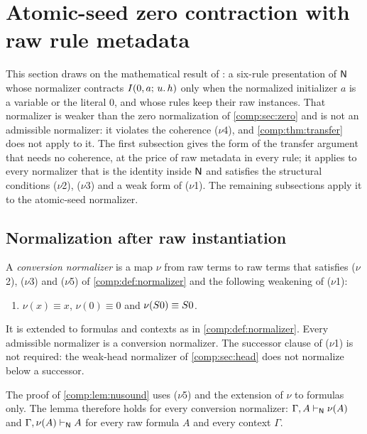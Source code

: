 \section{Atomic-seed zero contraction with raw rule metadata}
\label{comp:sec:atomic}

This section draws on the mathematical result of
: a six-rule presentation of $\mathsf{N}$ whose
normalizer contracts $I(0,a;\,u.\,h)$ only when the normalized initializer
$a$ is a variable or the literal $0$, and whose rules keep their raw
instances. That normalizer is weaker than the zero normalization of
\cref{comp:sec:zero} and is not an admissible normalizer: it violates the
coherence ($\nu$4), and \cref{comp:thm:transfer} does not apply to it. The
first subsection gives the form of the transfer argument that needs no
coherence, at the price of raw metadata in every rule; it applies to every
normalizer that is the identity inside $\mathsf{N}$ and satisfies the structural
conditions ($\nu$2), ($\nu$3) and a weak form of ($\nu$1). The remaining
subsections
apply it to the atomic-seed normalizer.

\subsection{Normalization after raw instantiation}

\begin{definition}
\label{comp:def:convnorm}
A \emph{conversion normalizer} is a map $\nu$ from raw terms to raw terms
that satisfies ($\nu$2), ($\nu$3) and ($\nu$5) of
\cref{comp:def:normalizer} and the following weakening of ($\nu$1):
\begin{enumerate}[label=($\nu$1$^{-}$)]
\item $\nu(x)\equiv x$, $\nu(0)\equiv0$ and $\nu(S0)\equiv S0$.
\end{enumerate}
It is extended to formulas and contexts as in \cref{comp:def:normalizer}.
Every admissible normalizer is a conversion normalizer. The successor
clause of ($\nu$1) is not required: the weak-head normalizer of
\cref{comp:sec:head} does not normalize below a successor.
\end{definition}

The proof of \cref{comp:lem:nusound} uses ($\nu$5) and the extension of
$\nu$ to formulas only. The lemma therefore holds for every conversion
normalizer: $\Gamma,A\vdash_{\mathsf{N}}\nu(A)$ and
$\Gamma,\nu(A)\vdash_{\mathsf{N}}A$ for every raw formula $A$ and every context
$\Gamma$.

